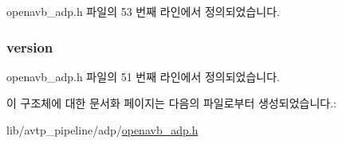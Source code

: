 openavb\+\_\+adp.\+h 파일의 53 번째 라인에서 정의되었습니다.

\subsubsection[{\texorpdfstring{version}{version}}]{ version}\hypertarget{structopenavb__adp__control__header__t_ae5d1ca2d5099c6a5f760c897505cb11b}{}\label{structopenavb__adp__control__header__t_ae5d1ca2d5099c6a5f760c897505cb11b}


openavb\+\_\+adp.\+h 파일의 51 번째 라인에서 정의되었습니다.



이 구조체에 대한 문서화 페이지는 다음의 파일로부터 생성되었습니다.\+:\begin{DoxyCompactItemize}
\item 
lib/avtp\+\_\+pipeline/adp/\hyperlink{openavb__adp_8h}{openavb\+\_\+adp.\+h}\end{DoxyCompactItemize}
